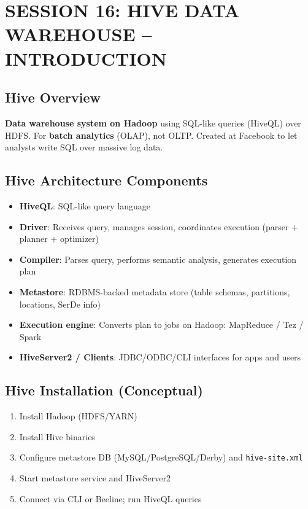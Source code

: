 \documentclass[11pt, onecolumn, a4paper]{article}
\begin{document}
\newpage
\section{SESSION 16: HIVE DATA WAREHOUSE -- INTRODUCTION}

\subsection{Hive Overview}

\textbf{Data warehouse system on Hadoop} using SQL-like queries (HiveQL) over HDFS. For \textbf{batch analytics} (OLAP), not OLTP. Created at Facebook to let analysts write SQL over massive log data.

\subsection{Hive Architecture Components}

\begin{itemize}
  \item \textbf{HiveQL}: SQL-like query language
  \item \textbf{Driver}: Receives query, manages session, coordinates execution (parser + planner + optimizer)
  \item \textbf{Compiler}: Parses query, performs semantic analysis, generates execution plan
  \item \textbf{Metastore}: RDBMS-backed metadata store (table schemas, partitions, locations, SerDe info)
  \item \textbf{Execution engine}: Converts plan to jobs on Hadoop: MapReduce / Tez / Spark
  \item \textbf{HiveServer2 / Clients}: JDBC/ODBC/CLI interfaces for apps and users
\end{itemize}

\subsection{Hive Installation (Conceptual)}

\begin{enumerate}
  \item Install Hadoop (HDFS/YARN)
  \item Install Hive binaries
  \item Configure metastore DB (MySQL/PostgreSQL/Derby) and \texttt{hive-site.xml}
  \item Start metastore service and HiveServer2
  \item Connect via CLI or Beeline; run HiveQL queries
\end{enumerate}
\end{document}
